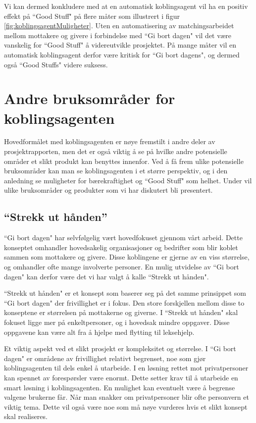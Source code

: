 Vi kan dermed konkludere med at en automatisk koblingsagent vil ha en positiv effekt på ``Good Stuff" på flere måter som illustrert i figur \ref{fig:koblingsagentMuligheter}. Uten en automatisering av matchingsarbeidet mellom mottakere og givere i forbindelse med ``Gi bort dagen" vil det være vanskelig for ``Good Stuff" å videreutvikle prosjektet. På mange måter vil en automatisk koblingsagent derfor være kritisk for ``Gi bort dagens", og dermed også ``Good Stuffs" videre suksess.

\section{Andre bruksområder for koblingsagenten }
\label{sec:andrebruksomrader}
Hovedformålet med koblingsagenten er nøye fremstilt i andre deler av prosjektrapporten, men det er også viktig å se på hvilke andre potensielle områder et slikt produkt kan benyttes innenfor. Ved å få frem ulike potensielle bruksområder kan man se koblingsagenten i et større perspektiv, og i den anledning se muligheter for bærekraftighet og ``Good Stuff" som helhet. Under vil ulike bruksområder og produkter som vi har diskutert bli presentert.

\subsection{“Strekk ut hånden”}
\label{sec:strekkuthanden}
``Gi bort dagen" har selvfølgelig vært hovedfokuset gjennom vårt arbeid. Dette konseptet omhandler hovedsakelig organisasjoner og bedrifter som blir koblet sammen som mottakere og givere. Disse koblingene er gjerne av en viss størrelse, og omhandler ofte mange involverte personer. En mulig utvidelse av ``Gi bort dagen" kan derfor være det vi har valgt å kalle ``Strekk ut hånden".

``Strekk ut hånden" er et konsept som baserer seg på det samme prinsippet som ``Gi bort dagen" der frivillighet er i fokus. Den store forskjellen mellom disse to konseptene er størrelsen på mottakerne og giverne. I ``Strekk ut hånden" skal fokuset ligge mer på enkeltpersoner, og i hovedsak mindre oppgaver. Disse oppgavene kan være alt fra å hjelpe med flytting til leksehjelp.

Et viktig aspekt ved et slikt prosjekt er kompleksitet og størrelse. I ``Gi bort dagen" er områdene av frivillighet relativt begrenset, noe som gjør koblingsagenten til dels enkel å utarbeide. I en løsning rettet mot privatpersoner kan spennet av forespørsler være enormt. Dette setter krav til å utarbeide en smart løsning i koblingsagenten. En mulighet kan eventuelt være å begrense valgene brukerne får. Når man snakker om privatpersoner blir ofte personvern et viktig tema. Dette vil også være noe som må nøye vurderes hvis et slikt konsept skal realiseres.

